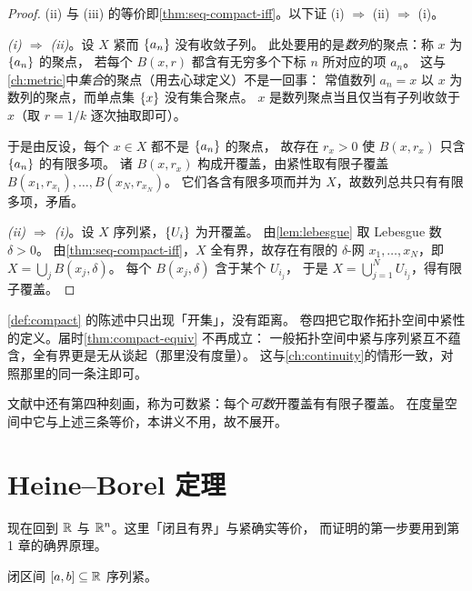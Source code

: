 \begin{proof}
  (ii) 与 (iii) 的等价即\cref{thm:seq-compact-iff}。以下证
  (i) \(\Rightarrow\) (ii) \(\Rightarrow\) (i)。

  \emph{(i) \(\Rightarrow\) (ii)}。设 \(X\) 紧而 \(\{a_{n}\}\) 没有收敛子列。
  此处要用的是\emph{数列}的聚点：称 \(x\) 为 \(\{a_{n}\}\) 的聚点，
  若每个 \(B(x,r)\) 都含有无穷多个下标 \(n\) 所对应的项 \(a_{n}\)。
  这与\cref{ch:metric}中\emph{集合}的聚点（用去心球定义）不是一回事：
  常值数列 \(a_{n}=x\) 以 \(x\) 为数列的聚点，而单点集 \(\left\{x\right\}\) 没有集合聚点。
  \(x\) 是数列聚点当且仅当有子列收敛于 \(x\)（取 \(r=1/k\) 逐次抽取即可）。

  于是由反设，每个 \(x \in X\) 都不是 \(\{a_{n}\}\) 的聚点，
  故存在 \(r_{x}>0\) 使 \(B(x,r_{x})\) 只含 \(\{a_{n}\}\) 的有限多项。
  诸 \(B(x,r_{x})\) 构成开覆盖，由紧性取有限子覆盖
  \(B(x_{1},r_{x_{1}}),\dots,B(x_{N},r_{x_{N}})\)。
  它们各含有限多项而并为 \(X\)，故数列总共只有有限多项，矛盾。

  \emph{(ii) \(\Rightarrow\) (i)}。设 \(X\) 序列紧，\(\left\{U_{i}\right\}\) 为开覆盖。
  由\cref{lem:lebesgue} 取 Lebesgue 数 \(\delta>0\)。
  由\cref{thm:seq-compact-iff}，\(X\) 全有界，故存在有限的 \(\delta\)-网
  \(x_{1},\dots,x_{N}\)，即 \(X = \bigcup_{j} B(x_{j},\delta)\)。
  每个 \(B(x_{j},\delta)\) 含于某个 \(U_{i_{j}}\)，
  于是 \(X = \bigcup_{j=1}^{N} U_{i_{j}}\)，得有限子覆盖。
\end{proof}

\begin{remark}[通往卷四的门]
  \cref{def:compact} 的陈述中只出现「开集」，没有距离。
  卷四把它取作拓扑空间中紧性的定义。届时\cref{thm:compact-equiv} 不再成立：
  一般拓扑空间中紧与序列紧互不蕴含，全有界更是无从谈起（那里没有度量）。
  这与\cref{ch:continuity}的情形一致，对照那里的同一条注即可。

  文献中还有第四种刻画，称为可数紧：每个\emph{可数}开覆盖有有限子覆盖。
  在度量空间中它与上述三条等价，本讲义不用，故不展开。
\end{remark}

\section{Heine--Borel 定理}
\label{sec:heine-borel}

现在回到 \(\mathbb{R}\) 与 \(\mathbb{R}^{n}\)。这里「闭且有界」与紧确实等价，
而证明的第一步要用到第 1 章的确界原理。

\begin{theorem}
  \label{thm:interval-compact}
  闭区间 \([a,b] \subseteq \mathbb{R}\) 序列紧。
\end{theorem}

